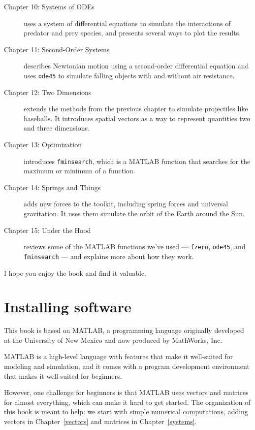 \begin{description}
\item [Chapter 10: Systems of ODEs] uses a system of differential equations to simulate the interactions of predator and prey species, and presents several ways to plot the results.

\item [Chapter 11: Second-Order Systems] describes Newtonian motion using a second-order differential equation and uses {\tt ode45} to simulate falling objects with and without air resistance.

\item [Chapter 12: Two Dimensions] extends the methods from the previous chapter to simulate projectiles like baseballs.  It introduces spatial vectors as a way to represent quantities two and three dimensions.

\item [Chapter 13: Optimization] introduces {\tt fminsearch}, which is a MATLAB function that searches for the maximum or minimum of a function.

\item [Chapter 14: Springs and Things] adds new forces to the toolkit, including spring forces and universal gravitation.  It uses them simulate the orbit of the Earth around the Sun.

\item [Chapter 15: Under the Hood] reviews some of the MATLAB functions we've used --- {\tt fzero}, {\tt ode45}, and {\tt fminsearch} --- and explains more about how they work.

\end{description}

I hope you enjoy the book and find it valuable.


\section*{Installing software}

This book is based on MATLAB, a programming language originally developed at the University of New Mexico and now produced by MathWorks, Inc.  

MATLAB is a high-level language with features that make it well-suited for modeling and simulation, and it comes with a program development environment that makes it well-suited for beginners.

However, one challenge for beginners is that MATLAB uses vectors and matrices for almost everything, which can make it hard to get started.  The organization of this book is meant to help: we start with simple numerical computations, adding vectors in Chapter~\ref{vectors} and matrices in Chapter~\ref{systems}.

